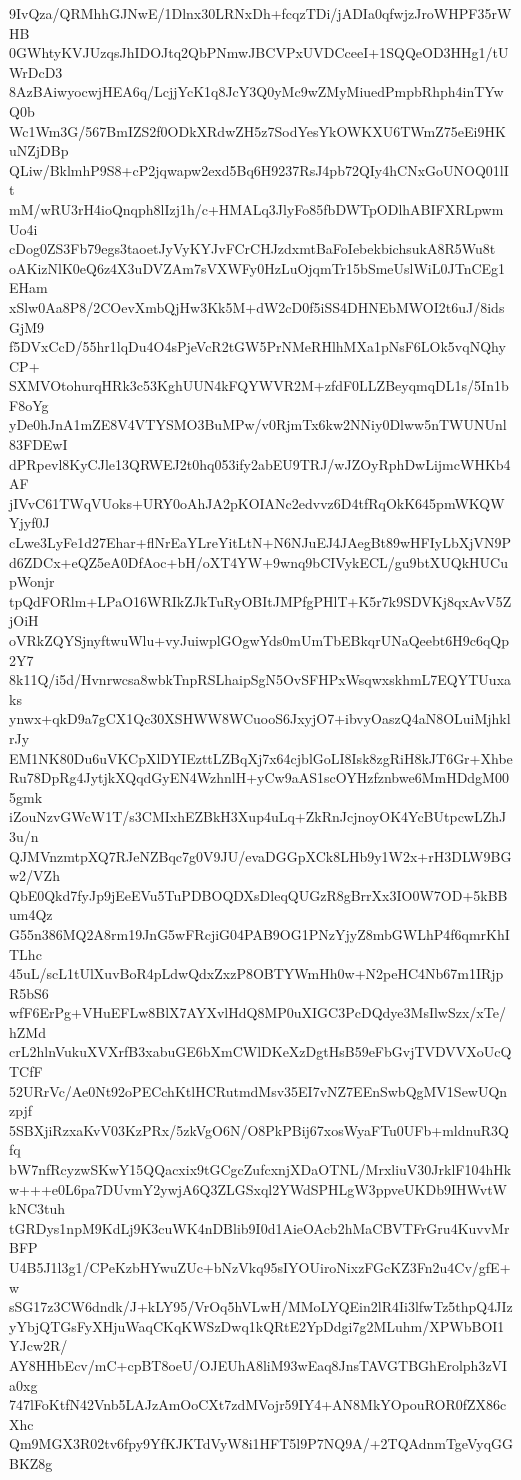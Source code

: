9IvQza/QRMhhGJNwE/1Dlnx30LRNxDh+fcqzTDi/jADIa0qfwjzJroWHPF35rWHB
0GWhtyKVJUzqsJhIDOJtq2QbPNmwJBCVPxUVDCceeI+1SQQeOD3HHg1/tUWrDcD3
8AzBAiwyocwjHEA6q/LcjjYcK1q8JcY3Q0yMc9wZMyMiuedPmpbRhph4inTYwQ0b
Wc1Wm3G/567BmIZS2f0ODkXRdwZH5z7SodYesYkOWKXU6TWmZ75eEi9HKuNZjDBp
QLiw/BklmhP9S8+cP2jqwapw2exd5Bq6H9237RsJ4pb72QIy4hCNxGoUNOQ01lIt
mM/wRU3rH4ioQnqph8lIzj1h/c+HMALq3JlyFo85fbDWTpODlhABIFXRLpwmUo4i
cDog0ZS3Fb79egs3taoetJyVyKYJvFCrCHJzdxmtBaFoIebekbichsukA8R5Wu8t
oAKizNlK0eQ6z4X3uDVZAm7sVXWFy0HzLuOjqmTr15bSmeUslWiL0JTnCEg1EHam
xSlw0Aa8P8/2COevXmbQjHw3Kk5M+dW2cD0f5iSS4DHNEbMWOI2t6uJ/8idsGjM9
f5DVxCcD/55hr1lqDu4O4sPjeVcR2tGW5PrNMeRHlhMXa1pNsF6LOk5vqNQhyCP+
SXMVOtohurqHRk3c53KghUUN4kFQYWVR2M+zfdF0LLZBeyqmqDL1s/5In1bF8oYg
yDe0hJnA1mZE8V4VTYSMO3BuMPw/v0RjmTx6kw2NNiy0Dlww5nTWUNUnl83FDEwI
dPRpevl8KyCJle13QRWEJ2t0hq053ify2abEU9TRJ/wJZOyRphDwLijmcWHKb4AF
jIVvC61TWqVUoks+URY0oAhJA2pKOIANc2edvvz6D4tfRqOkK645pmWKQWYjyf0J
cLwe3LyFe1d27Ehar+flNrEaYLreYitLtN+N6NJuEJ4JAegBt89wHFIyLbXjVN9P
d6ZDCx+eQZ5eA0DfAoc+bH/oXT4YW+9wnq9bCIVykECL/gu9btXUQkHUCupWonjr
tpQdFORlm+LPaO16WRIkZJkTuRyOBItJMPfgPHlT+K5r7k9SDVKj8qxAvV5ZjOiH
oVRkZQYSjnyftwuWlu+vyJuiwplGOgwYds0mUmTbEBkqrUNaQeebt6H9c6qQp2Y7
8k11Q/i5d/Hvnrwcsa8wbkTnpRSLhaipSgN5OvSFHPxWsqwxskhmL7EQYTUuxaks
ynwx+qkD9a7gCX1Qc30XSHWW8WCuooS6JxyjO7+ibvyOaszQ4aN8OLuiMjhklrJy
EM1NK80Du6uVKCpXlDYIEzttLZBqXj7x64cjblGoLI8Isk8zgRiH8kJT6Gr+Xhbe
Ru78DpRg4JytjkXQqdGyEN4WzhnlH+yCw9aAS1scOYHzfznbwe6MmHDdgM005gmk
iZouNzvGWcW1T/s3CMIxhEZBkH3Xup4uLq+ZkRnJcjnoyOK4YcBUtpcwLZhJ3u/n
QJMVnzmtpXQ7RJeNZBqc7g0V9JU/evaDGGpXCk8LHb9y1W2x+rH3DLW9BGw2/VZh
QbE0Qkd7fyJp9jEeEVu5TuPDBOQDXsDleqQUGzR8gBrrXx3IO0W7OD+5kBBum4Qz
G55n386MQ2A8rm19JnG5wFRcjiG04PAB9OG1PNzYjyZ8mbGWLhP4f6qmrKhITLhc
45uL/scL1tUlXuvBoR4pLdwQdxZxzP8OBTYWmHh0w+N2peHC4Nb67m1IRjpR5bS6
wfF6ErPg+VHuEFLw8BlX7AYXvlHdQ8MP0uXIGC3PcDQdye3MsIlwSzx/xTe/hZMd
crL2hlnVukuXVXrfB3xabuGE6bXmCWlDKeXzDgtHsB59eFbGvjTVDVVXoUcQTCfF
52URrVc/Ae0Nt92oPECchKtlHCRutmdMsv35EI7vNZ7EEnSwbQgMV1SewUQnzpjf
5SBXjiRzxaKvV03KzPRx/5zkVgO6N/O8PkPBij67xosWyaFTu0UFb+mldnuR3Qfq
bW7nfRcyzwSKwY15QQacxix9tGCgcZufcxnjXDaOTNL/MrxliuV30JrklF104hHk
w+++e0L6pa7DUvmY2ywjA6Q3ZLGSxql2YWdSPHLgW3ppveUKDb9IHWvtWkNC3tuh
tGRDys1npM9KdLj9K3cuWK4nDBlib9I0d1AieOAcb2hMaCBVTFrGru4KuvvMrBFP
U4B5J1l3g1/CPeKzbHYwuZUc+bNzVkq95sIYOUiroNixzFGcKZ3Fn2u4Cv/gfE+w
sSG17z3CW6dndk/J+kLY95/VrOq5hVLwH/MMoLYQEin2lR4Ii3lfwTz5thpQ4JIz
yYbjQTGsFyXHjuWaqCKqKWSzDwq1kQRtE2YpDdgi7g2MLuhm/XPWbBOI1YJcw2R/
AY8HHbEcv/mC+cpBT8oeU/OJEUhA8liM93wEaq8JnsTAVGTBGhErolph3zVIa0xg
747lFoKtfN42Vnb5LAJzAmOoCXt7zdMVojr59IY4+AN8MkYOpouROR0fZX86cXhc
Qm9MGX3R02tv6fpy9YfKJKTdVyW8i1HFT5l9P7NQ9A/+2TQAdnmTgeVyqGGBKZ8g
